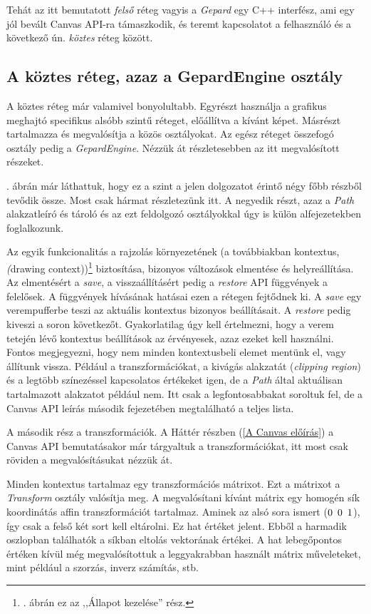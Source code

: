 \documentclass[12pt]{report}
\theoremstyle{definition}
\newcommand{\inenglish}[1]{\textsl{#1}}
\newcommand{\func}[1]{{\textsl{#1}}}
\begin{document}
Tehát az itt bemutatott \emph{felső} réteg vagyis a \func{Gepard} egy C++
interfész, ami egy jól bevált Canvas API-ra támaszkodik, és teremt kapcsolatot
a felhasználó és a következő ún. \emph{köztes} réteg között.

    \subsection*{A köztes réteg, azaz a GepardEngine osztály}

A köztes réteg már valamivel bonyolultabb. Egyrészt használja a grafikus
meghajtó specifikus alsóbb szintű réteget, előállítva a kívánt képet. Másrészt
tartalmazza és megvalósítja a közös osztályokat. Az egész réteget összefogó
osztály pedig a \func{GepardEngine}. Nézzük át részletesebben az itt
megvalósított részeket.

. ábrán már láthattuk, hogy ez a szint a jelen dolgozatot
érintő négy főbb részből tevődik össze. Most csak hármat részletezünk itt. A
negyedik részt, azaz a \emph{Path} alakzatleíró és tároló és az ezt feldolgozó
osztályokkal úgy is külön alfejezetekben foglalkozunk.

Az egyik funkcionalitás a rajzolás környezetének (a továbbiakban kontextus,
\inenglish(drawing context))\footnote{. ábrán ez az
,,Állapot kezelése'' rész.} biztosítása, bizonyos változások elmentése és
helyreállítása. Az elmentésért a \func{save}, a visszaállításért pedig a
\func{restore} API függvények a felelősek. A függvények hívásának hatásai ezen
a rétegen fejtődnek ki. A \func{save} egy verempufferbe teszi az aktuális
kontextus bizonyos beállításait. A \func{restore} pedig kiveszi a soron
következőt. Gyakorlatilag úgy kell értelmezni, hogy a verem tetején lévő
kontextus beállítások az érvényesek, azaz ezeket kell használni. Fontos
megjegyezni, hogy nem minden kontextusbeli elemet mentünk el, vagy állítunk
vissza. Például a transzformációkat, a kivágás alakzatát (\inenglish{clipping
region}) és a legtöbb színezéssel kapcsolatos értékeket igen, de a \emph{Path}
által aktuálisan tartalmazott alakzatot például nem. Itt csak a
legfontosabbakat soroltuk fel, de a Canvas API leírás \cite{Cabanier:14:HCC}
második fejezetében megtalálható a teljes lista.

A második rész a transzformációk. A Háttér részben (\ref{A Canvas előírás}) a
Canvas API bemutatásakor már tárgyaltuk a transzformációkat, itt most csak
röviden a megvalósításukat nézzük át.

Minden kontextus tartalmaz egy transzformációs mátrixot. Ezt a mátrixot a
\func{Transform} osztály valósítja meg. A megvalósítani kívánt mátrix egy
homogén sík koordinátás affin transzformációt tartalmaz. Aminek az alsó sora
ismert ($0\enskip 0\enskip 1$), így csak a felső két sort kell eltárolni. Ez
hat értéket jelent. Ebből a harmadik oszlopban találhatók a síkban eltolás
vektorának értékei. A hat lebegőpontos értéken kívül még megvalósítottuk a
leggyakrabban használt mátrix műveleteket, mint például a szorzás, inverz
számítás, stb.
\end{document}
